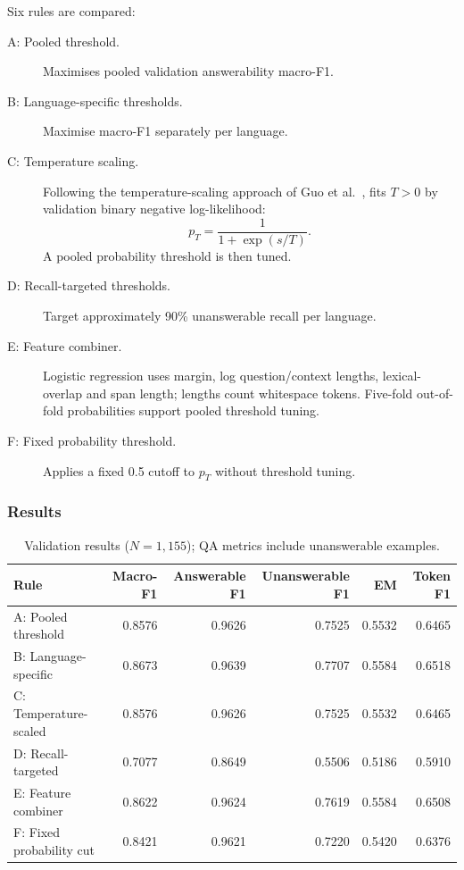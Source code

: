 \documentclass[11pt]{article}
\begin{document}
\noindent
Six rules are compared:
\begin{description}
    \item[A: Pooled threshold.] Maximises pooled validation answerability macro-F1.
    \item[B: Language-specific thresholds.] Maximise macro-F1 separately per language.
    \item[C: Temperature scaling.] Following the temperature-scaling approach of Guo et al.~\cite{guo2017calibration}, fits $T>0$ by validation binary negative log-likelihood:
    \[
        p_{T} = \frac{1}{1+\exp(s/T)}.
    \]
    A pooled probability threshold is then tuned.
    \item[D: Recall-targeted thresholds.] Target approximately 90\% unanswerable recall per language.
    \item[E: Feature combiner.] Logistic regression uses margin, log question/context lengths, lexical-overlap and span length; lengths count whitespace tokens. Five-fold out-of-fold probabilities support pooled threshold tuning.
    \item[F: Fixed probability threshold.]
    Applies a fixed 0.5 cutoff to $p_{T}$ without threshold tuning.
\end{description}

\subsubsection*{Results}

\begin{table}[H]
    \centering
    \small
    \begin{tabular}{lrrrrr}
        \toprule
        Rule & Macro-F1 & Answerable F1 & Unanswerable F1 & EM & Token F1 \\
        \midrule
        A: Pooled threshold       & 0.8576 & 0.9626 & 0.7525 & 0.5532 & 0.6465 \\
        B: Language-specific      & 0.8673 & 0.9639 & 0.7707 & 0.5584 & 0.6518 \\
        C: Temperature-scaled     & 0.8576 & 0.9626 & 0.7525 & 0.5532 & 0.6465 \\
        D: Recall-targeted        & 0.7077 & 0.8649 & 0.5506 & 0.5186 & 0.5910 \\
        E: Feature combiner       & 0.8622 & 0.9624 & 0.7619 & 0.5584 & 0.6508 \\
        F: Fixed probability cut  & 0.8421 & 0.9621 & 0.7220 & 0.5420 & 0.6376 \\
        \bottomrule
    \end{tabular}
    \caption{Validation results ($N=1{,}155$); QA metrics include
    unanswerable examples.}
    \label{table:week_43_overall}
\end{table}
\end{document}
